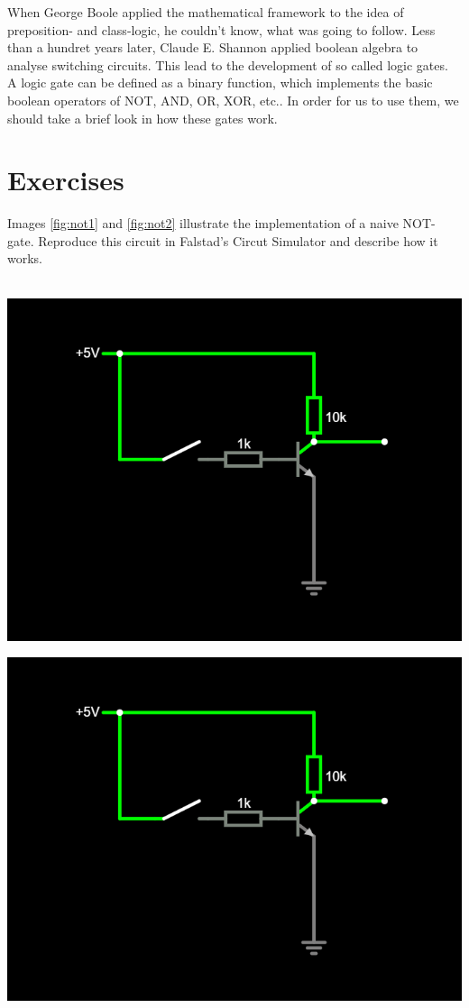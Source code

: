\documentclass{dcbl/challenge}
\begin{document}
When George Boole applied the mathematical framework to the idea of preposition- and class-logic, he couldn't know, what was going to follow. 
Less than a hundret years later, Claude E. Shannon applied boolean algebra to analyse switching circuits.
This lead to the development of so called logic gates. 
A logic gate can be defined as a binary function, which implements the basic boolean operators of NOT, AND, OR, XOR, etc.. 
In order for us to use them, we should take a brief look in how these gates work. 

\section*{Exercises}
\begin{aufgabe}
    Images \ref{fig:not1} and \ref{fig:not2} illustrate the implementation of a naive NOT-gate.
    Reproduce this circuit in Falstad's Circut Simulator and describe how it works.\\\\
    \vspace{1cm}
    \noindent 
    \begin{minipage}{.5\textwidth} 
    \centering
    \includegraphics[width=.9\linewidth]{not1.png} 
    \label{fig:not1}
    \end{minipage}
    \begin{minipage}{.5\textwidth}
    \centering
    \includegraphics[width=.9\linewidth]{not1.png}

\end{minipage}
\end{aufgabe}
\end{document}
